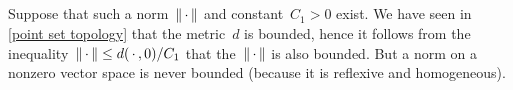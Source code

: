 \addtocounter{subsection}{2}
\subsection{}

Suppose that such a norm~$\lVert\,\cdot\,\rVert$ and constant~$C_1 > 0$ exist.
We have seen in \cref{point set topology} that the metric~$d$ is bounded, hence it follows from the inequality~$\lVert\,\cdot\,\rVert \leq d(\,\cdot\,,0)/C_1$ that the~$\lVert\,\cdot\,\rVert$ is also bounded.
But a norm on a nonzero vector space is never bounded (because it is reflexive and homogeneous).




